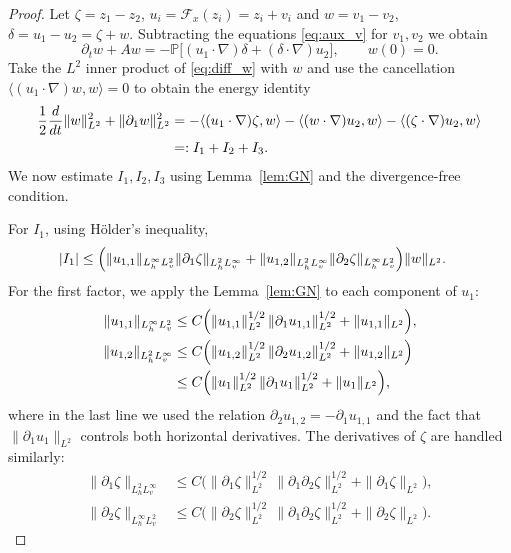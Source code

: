 \documentclass[10pt,a4paper]{amsart}
\begin{document}
\begin{proof}
  Let $\zeta = z_1-z_2$, $u_i = \mathcal F_x(z_i)=z_i+v_i$ and
  $w = v_1-v_2$, $\delta = u_1-u_2 = \zeta + w$.
  Subtracting the equations \eqref{eq:aux_v} for $v_1,v_2$ we obtain
  \begin{equation}\label{eq:diff_w}
    \partial_t w + A w = - \mathbb P\bigl[(u_1\cdot\nabla)\delta
    + (\delta\cdot\nabla)u_2\bigr], \qquad w(0)=0 .
  \end{equation}
  Take the $L^2$ inner product of \eqref{eq:diff_w} with $w$ and use the
  cancellation $\langle (u_1\cdot\nabla)w, w\rangle =0$
  to obtain the energy identity
  \begin{align}\label{eq:energy_w}
    \frac12 \frac{d}{dt}\|w\|_{L^2}^2 + \|\partial_1 w\|_{L^2}^2
    &= -\langle (u_1\cdot\nabla)\zeta, w\rangle
      - \langle (w\cdot\nabla)u_2, w\rangle
      - \langle (\zeta\cdot\nabla)u_2, w\rangle \notag\\
    &=: I_1 + I_2 + I_3 .
  \end{align}
  We now estimate $I_1,I_2,I_3$ using Lemma~\ref{lem:GN} and the
  divergence-free condition.

  For $I_1$, using H\"older's inequality,
\begin{align*}
  |I_1| &\le \Bigl( \|u_{1,1}\|_{L^\infty_h L^2_v} \|\partial_1\zeta\|_{L^2_h L^\infty_v}
          + \|u_{1,2}\|_{L^2_h L^\infty_v} \|\partial_2\zeta\|_{L^\infty_h L^2_v} \Bigr) \|w\|_{L^2}.
\end{align*}
For the first factor, we apply the Lemma~\ref{lem:GN} to each component of $u_1$:
\begin{align*}
  \|u_{1,1}\|_{L^\infty_h L^2_v}
  &\le C\Bigl(\|u_{1,1}\|_{L^2}^{1/2}\,\|\partial_1 u_{1,1}\|_{L^2}^{1/2}
            + \|u_{1,1}\|_{L^2}\Bigr),\\
  \|u_{1,2}\|_{L^2_h L^\infty_v}
  &\le C\Bigl(\|u_{1,2}\|_{L^2}^{1/2}\,\|\partial_2 u_{1,2}\|_{L^2}^{1/2}
            + \|u_{1,2}\|_{L^2}\Bigr) \\
  &\le C\Bigl(\|u_1\|_{L^2}^{1/2}\,\|\partial_1 u_1\|_{L^2}^{1/2}
            + \|u_1\|_{L^2}\Bigr),
\end{align*}
where in the last line we used the relation $\partial_2 u_{1,2} = -\partial_1 u_{1,1}$
and the fact that $\|\partial_1 u_1\|_{L^2}$ controls
both horizontal derivatives.  The derivatives of $\zeta$ are handled similarly:
\begin{align*}
  \|\partial_1\zeta\|_{L^2_h L^\infty_v}
  &\le C\bigl(\|\partial_1\zeta\|_{L^2}^{1/2}\,\|\partial_1\partial_2\zeta\|_{L^2}^{1/2}
      + \|\partial_1\zeta\|_{L^2}\bigr),\\
\|\partial_2\zeta\|_{L^\infty_h L^2_v}
  &\le C\bigl(\|\partial_2\zeta\|_{L^2}^{1/2}\,\|\partial_1\partial_2\zeta\|_{L^2}^{1/2}
      + \|\partial_2\zeta\|_{L^2}\bigr).
\end{align*}


\end{proof}
\end{document}
